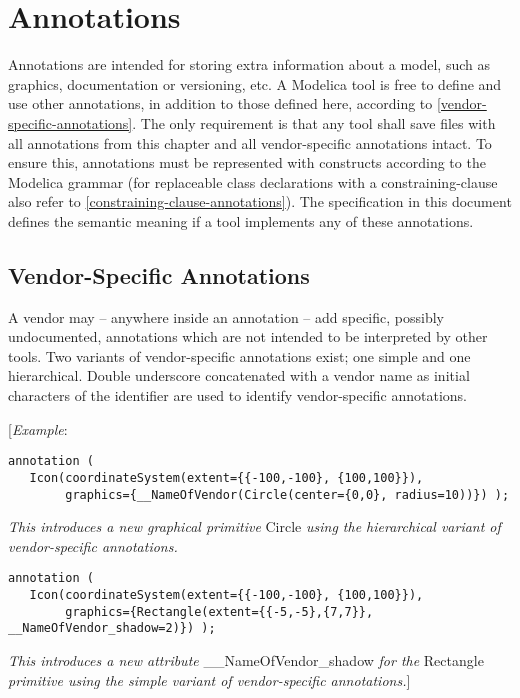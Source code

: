 
\chapter{Annotations}

Annotations are intended for storing extra information about a model,
such as graphics, documentation or versioning, etc. A Modelica tool is
free to define and use other annotations, in addition to those defined
here, according to \ref{vendor-specific-annotations}. The only requirement is that any tool
shall save files with all annotations from this chapter and all
vendor-specific annotations intact. To ensure this, annotations must be
represented with constructs according to the Modelica grammar (for
replaceable class declarations with a constraining-clause also refer to
\ref{constraining-clause-annotations}). The specification in this document defines the
semantic meaning if a tool implements any of these annotations.

\section{Vendor-Specific Annotations}

A vendor may -- anywhere inside an annotation -- add specific, possibly
undocumented, annotations which are not intended to be interpreted by
other tools. Two variants of vendor-specific annotations exist; one
simple and one hierarchical. Double underscore concatenated with a
vendor name as initial characters of the identifier are used to identify
vendor-specific annotations.

{[}\emph{Example}:
\begin{lstlisting}[language=modelica]
annotation (
   Icon(coordinateSystem(extent={{-100,-100}, {100,100}}),
        graphics={__NameOfVendor(Circle(center={0,0}, radius=10))}) );
\end{lstlisting}
\emph{This introduces a new graphical primitive} Circle \emph{using the
hierarchical variant of vendor-specific annotations.}
\begin{lstlisting}[language=modelica]
annotation (
   Icon(coordinateSystem(extent={{-100,-100}, {100,100}}),
        graphics={Rectangle(extent={{-5,-5},{7,7}}, __NameOfVendor_shadow=2)}) );
\end{lstlisting}
\emph{This introduces a new attribute} \_\_NameOfVendor\_shadow
\emph{for the} Rectangle \emph{primitive using the simple variant of
vendor-specific annotations.}{]}

